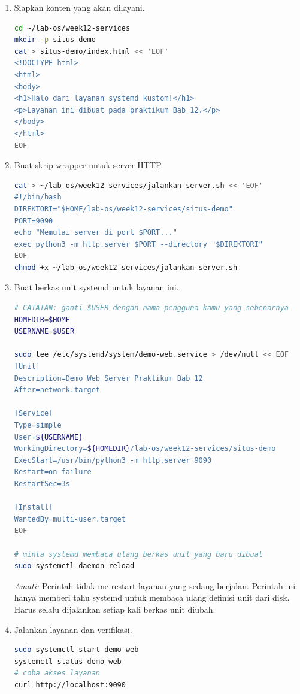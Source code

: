 \begin{enumerate}
    \item Siapkan konten yang akan dilayani.
\begin{lstlisting}[language=bash, caption={Menyiapkan direktori dan konten layanan}]
cd ~/lab-os/week12-services
mkdir -p situs-demo
cat > situs-demo/index.html << 'EOF'
<!DOCTYPE html>
<html>
<body>
<h1>Halo dari layanan systemd kustom!</h1>
<p>Layanan ini dibuat pada praktikum Bab 12.</p>
</body>
</html>
EOF
\end{lstlisting}

    \item Buat skrip wrapper untuk server HTTP.
\begin{lstlisting}[language=bash, caption={Skrip server HTTP untuk layanan}]
cat > ~/lab-os/week12-services/jalankan-server.sh << 'EOF'
#!/bin/bash
DIREKTORI="$HOME/lab-os/week12-services/situs-demo"
PORT=9090
echo "Memulai server di port $PORT..."
exec python3 -m http.server $PORT --directory "$DIREKTORI"
EOF
chmod +x ~/lab-os/week12-services/jalankan-server.sh
\end{lstlisting}

    \item Buat berkas unit systemd untuk layanan ini.
\begin{lstlisting}[language=bash, caption={Membuat berkas unit kustom}]
# CATATAN: ganti $USER dengan nama pengguna kamu yang sebenarnya
HOMEDIR=$HOME
USERNAME=$USER

sudo tee /etc/systemd/system/demo-web.service > /dev/null << EOF
[Unit]
Description=Demo Web Server Praktikum Bab 12
After=network.target

[Service]
Type=simple
User=${USERNAME}
WorkingDirectory=${HOMEDIR}/lab-os/week12-services/situs-demo
ExecStart=/usr/bin/python3 -m http.server 9090
Restart=on-failure
RestartSec=3s

[Install]
WantedBy=multi-user.target
EOF

# minta systemd membaca ulang berkas unit yang baru dibuat
sudo systemctl daemon-reload
\end{lstlisting}

    \textit{Amati:} Perintah  tidak me-restart layanan yang sedang berjalan. Perintah ini hanya memberi tahu systemd untuk membaca ulang definisi unit dari disk. Harus selalu dijalankan setiap kali berkas unit diubah.

    \item Jalankan layanan dan verifikasi.
\begin{lstlisting}[language=bash, caption={Menjalankan dan memverifikasi layanan kustom}]
sudo systemctl start demo-web
systemctl status demo-web
# coba akses layanan
curl http://localhost:9090
\end{lstlisting}


\end{enumerate}
